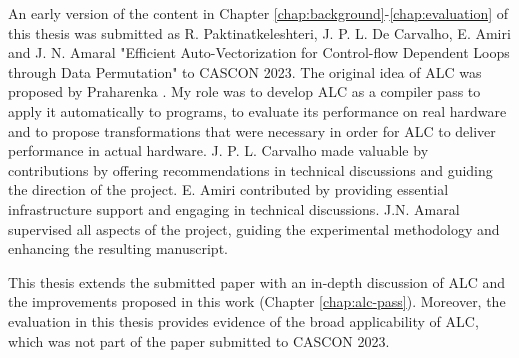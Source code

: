 \begin{preface}

\setlength{\baselineskip}{1.6\baselineskip} 
An early version of the content in Chapter \ref{chap:background}-\ref{chap:evaluation} of this thesis was submitted as R. Paktinatkeleshteri, J. P. L. De Carvalho, E. Amiri and J. N. Amaral "Efficient Auto-Vectorization for Control-flow Dependent Loops through Data Permutation" to CASCON 2023.
The original idea of ALC was proposed by Praharenka \etal. My role was to develop ALC as a compiler pass to apply it automatically to programs, to evaluate its performance on real hardware and to propose transformations that were necessary in order for ALC to deliver performance in actual hardware.  J. P. L. Carvalho made valuable by contributions by offering recommendations in technical discussions and guiding the direction of the project. E. Amiri contributed  by providing essential infrastructure support and engaging in technical discussions. J.N. Amaral supervised all aspects of the project, guiding the experimental methodology and enhancing the resulting manuscript.

This thesis extends the submitted paper with an in-depth discussion of ALC and the improvements proposed in this work (Chapter \ref{chap:alc-pass}).
Moreover, the evaluation in this thesis provides evidence of the broad applicability of ALC, which was not part of the paper submitted to CASCON 2023.

\end{preface}